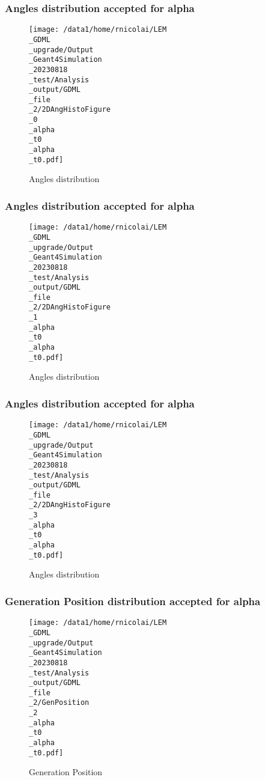 \documentclass[8pt]{beamer}
\begin{document}
            \begin{frame}
                \frametitle{Angles distribution accepted for alpha}
            
        \begin{figure}[h]
            \centering
            \texttt{[image: /data1/home/rnicolai/LEM\\\_GDML\\\_upgrade/Output\\\_Geant4Simulation\\\_20230818\\\_test/Analysis\\\_output/GDML\\\_file\\\_2/2DAngHistoFigure\\\_0\\\_alpha\\\_t0\\\_alpha\\\_t0.pdf]}
            \caption{Angles distribution}
        \end{figure}
        
            \end{frame}
            
            \begin{frame}
                \frametitle{Angles distribution accepted for alpha}
            
        \begin{figure}[h]
            \centering
            \texttt{[image: /data1/home/rnicolai/LEM\\\_GDML\\\_upgrade/Output\\\_Geant4Simulation\\\_20230818\\\_test/Analysis\\\_output/GDML\\\_file\\\_2/2DAngHistoFigure\\\_1\\\_alpha\\\_t0\\\_alpha\\\_t0.pdf]}
            \caption{Angles distribution}
        \end{figure}
        
            \end{frame}
            
            \begin{frame}
                \frametitle{Angles distribution accepted for alpha}
            
        \begin{figure}[h]
            \centering
            \texttt{[image: /data1/home/rnicolai/LEM\\\_GDML\\\_upgrade/Output\\\_Geant4Simulation\\\_20230818\\\_test/Analysis\\\_output/GDML\\\_file\\\_2/2DAngHistoFigure\\\_3\\\_alpha\\\_t0\\\_alpha\\\_t0.pdf]}
            \caption{Angles distribution}
        \end{figure}
        
            \end{frame}
            
            \begin{frame}
                \frametitle{Generation Position distribution accepted for alpha}
            
        \begin{figure}[h]
            \centering
            \texttt{[image: /data1/home/rnicolai/LEM\\\_GDML\\\_upgrade/Output\\\_Geant4Simulation\\\_20230818\\\_test/Analysis\\\_output/GDML\\\_file\\\_2/GenPosition\\\_2\\\_alpha\\\_t0\\\_alpha\\\_t0.pdf]}
            \caption{Generation Position}
        \end{figure}
        
            \end{frame}
            
\end{document}
